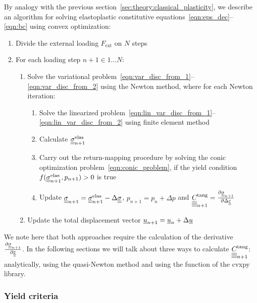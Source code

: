 \documentclass[12pt]{article}
\begin{document}
By analogy with the previous section~\ref{sec:theory:classical_plasticity}, we describe an algorithm for solving elastoplastic constitutive equations~\eqref{eqn:eps_dec}--\eqref{eqn:bc} using convex optimization:
\begin{enumerate}
    \item Divide the external loading $F_\text{ext}$ on $N$ steps
    \item For each loading step $n+1 \in {1 \dots N}$:
    \begin{enumerate}
        \item Solve the variational problem~\eqref{eqn:var_disc_from_1}--\eqref{eqn:var_disc_from_2} using the Newton method, where for each Newton iteration:
        \begin{enumerate}
            \item Solve the linearized problem~\eqref{eqn:lin_var_disc_from_1}--\eqref{eqn:lin_var_disc_from_2} using finite element method
            \item Calculate $\underline{\underline{\sigma}}_{n+1}^{\text{elas}}$ 
            \item Carry out the return-mapping procedure by solving the conic optimization problem~\eqref{eqn:conic_problem}, if the yield condition $f(\underline{\underline{\sigma}}_{n+1}^{\text{elas}}, p_{n+1}) > 0$ is true
            \item Update $\underline{\underline{\sigma}}_{n+1} = \underline{\underline{\sigma}}_{n+1}^{\text{elas}} - \Delta\underline{\underline{\sigma}}$, $p_{n+1} = p_n + \Delta p$ and $\underline{\underline{\underline{\underline{C_{}}}}}^\text{tang}_{n+1} = \frac{\partial \underline{\underline{\sigma}}_{n+1}}{\partial\Delta\underline{\underline{\varepsilon}}}$ 
        \end{enumerate}
        \item Update the total displacement vector $\underline{u}_{n+1} = \underline{u}_n + \Delta\underline{u}$
    \end{enumerate}
\end{enumerate}

We note here that both approaches require the calculation of the derivative $\frac{\partial\underline{\underline{\sigma}}_{n+1}}{\partial\underline{\underline{\varepsilon}}}$. In the following sections we will talk about three ways to calculate $\underline{\underline{\underline{\underline{C_{}}}}}^\text{tang}_{n+1}$: analytically, using the quasi-Newton method and using the  function of the cvxpy library.

\subsubsection{Yield criteria}
\end{document}
